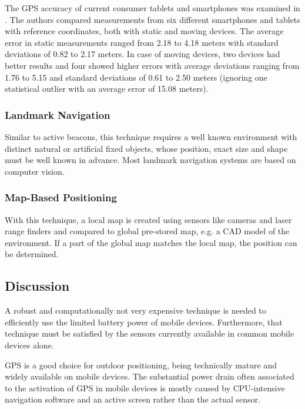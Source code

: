 \label{gps-prec}
The GPS accuracy of current consumer tablets and smartphones was examined in \cite{gps-precision}. The authors compared measurements from six different smartphones and tablets with reference coordinates, both with static and moving devices. The average error in static measurements ranged from 2.18 to 4.18 meters with standard deviations of 0.82 to 2.17 meters. In case of moving devices, two devices had better results and four showed higher errors with average deviations ranging from 1.76 to 5.15 and standard deviations of 0.61 to 2.50 meters (ignoring one statistical outlier with an average error of 15.08 meters).


\subsubsection*{Landmark Navigation}

Similar to active beacons, this technique requires a well known environment with distinct natural or artificial fixed objects, whose position, exact size and shape must be well known in advance. Most landmark navigation systems are based on computer vision.

\subsubsection*{Map-Based Positioning}

With this technique, a local map is created using sensors like cameras and laser range finders and compared to global pre-stored map, e.g. a CAD model of the environment. If a part of the global map matches the local map, the position can be determined. 

\subsection{Discussion}

A robust and computationally not very expensive technique is needed to efficiently use the limited battery power of mobile devices. Furthermore, that technique must be satisfied by the sensors currently available in common mobile devices alone.

GPS is a good choice for outdoor positioning, being technically mature and widely available on mobile devices. The substantial power drain often associated to the activation of GPS in mobile devices is mostly caused by CPU-intensive navigation software and an active screen rather than the actual sensor.

